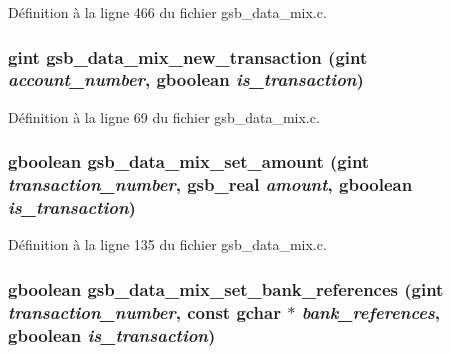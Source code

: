 Définition à la ligne 466 du fichier gsb\_\-data\_\-mix.c.

\subsubsection[{gsb\_\-data\_\-mix\_\-new\_\-transaction}]{\setlength{\rightskip}{0pt plus 5cm}gint gsb\_\-data\_\-mix\_\-new\_\-transaction (gint {\em account\_\-number}, \/  gboolean {\em is\_\-transaction})}\label{gsb__data__mix_8h_a5714cbc7cb820305d7ac6cf5b114d47e}


Définition à la ligne 69 du fichier gsb\_\-data\_\-mix.c.

\subsubsection[{gsb\_\-data\_\-mix\_\-set\_\-amount}]{\setlength{\rightskip}{0pt plus 5cm}gboolean gsb\_\-data\_\-mix\_\-set\_\-amount (gint {\em transaction\_\-number}, \/  {\bf gsb\_\-real} {\em amount}, \/  gboolean {\em is\_\-transaction})}\label{gsb__data__mix_8h_a022e6c0c15e4571efdc96764aa91319c}


Définition à la ligne 135 du fichier gsb\_\-data\_\-mix.c.

\subsubsection[{gsb\_\-data\_\-mix\_\-set\_\-bank\_\-references}]{\setlength{\rightskip}{0pt plus 5cm}gboolean gsb\_\-data\_\-mix\_\-set\_\-bank\_\-references (gint {\em transaction\_\-number}, \/  const gchar $\ast$ {\em bank\_\-references}, \/  gboolean {\em is\_\-transaction})}\label{gsb__data__mix_8h_affc56e22d9b1e1efd43277730d3cc0c3}


